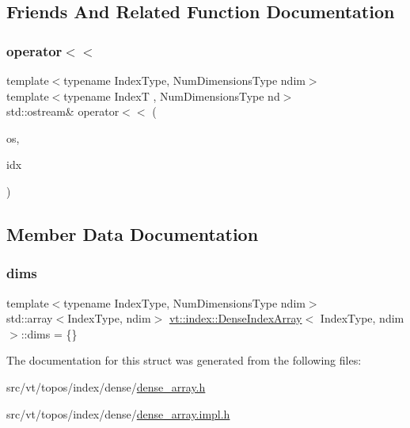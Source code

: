 \subsection{Friends And Related Function Documentation}
\mbox{\label{structvt_1_1index_1_1_dense_index_array_ad8dd7b7925f5c66e3264bd14c3e4f2ce}} 
\subsubsection{\texorpdfstring{operator$<$$<$}{operator<<}}
{\footnotesize\ttfamily template$<$typename Index\+Type, Num\+Dimensions\+Type ndim$>$ \\
template$<$typename IndexT , Num\+Dimensions\+Type nd$>$ \\
std\+::ostream\& operator$<$$<$ (\begin{DoxyParamCaption}\item[{std\+::ostream \&}]{os,  }\item[{\hyperlink{structvt_1_1index_1_1_dense_index_array}{Dense\+Index\+Array}$<$ IndexT, nd $>$ const \&}]{idx }\end{DoxyParamCaption})\hspace{0.3cm}{\ttfamily [friend]}}



\subsection{Member Data Documentation}
\mbox{\label{structvt_1_1index_1_1_dense_index_array_a85e08cf36301f829ba9a15257c65f39c}} 
\subsubsection{\texorpdfstring{dims}{dims}}
{\footnotesize\ttfamily template$<$typename Index\+Type, Num\+Dimensions\+Type ndim$>$ \\
std\+::array$<$Index\+Type, ndim$>$ \hyperlink{structvt_1_1index_1_1_dense_index_array}{vt\+::index\+::\+Dense\+Index\+Array}$<$ Index\+Type, ndim $>$\+::dims = \{\}\hspace{0.3cm}{\ttfamily [private]}}



The documentation for this struct was generated from the following files\+:\begin{DoxyCompactItemize}
\item 
src/vt/topos/index/dense/\hyperlink{dense__array_8h}{dense\+\_\+array.\+h}\item 
src/vt/topos/index/dense/\hyperlink{dense__array_8impl_8h}{dense\+\_\+array.\+impl.\+h}\end{DoxyCompactItemize}
